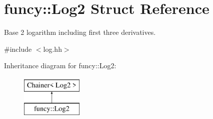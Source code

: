 \hypertarget{structfuncy_1_1Log2}{\section{funcy\-:\-:Log2 Struct Reference}
\label{structfuncy_1_1Log2}
}


Base 2 logarithm including first three derivatives.  




{\ttfamily \#include $<$log.\-hh$>$}

Inheritance diagram for funcy\-:\-:Log2\-:\begin{figure}[H]
\begin{center}
\leavevmode
\includegraphics[height=2.000000cm]{structfuncy_1_1Log2}
\end{center}
\end{figure}

